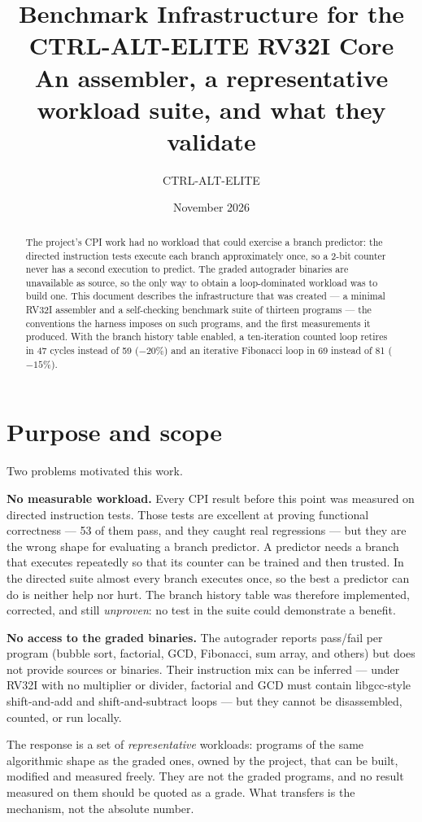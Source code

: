 \documentclass[11pt]{article}
\title{Benchmark Infrastructure for the CTRL-ALT-ELITE RV32I Core\\
\large An assembler, a representative workload suite, and what they validate}
\author{CTRL-ALT-ELITE}
\date{November 2026}
\begin{document}
\maketitle

\begin{abstract}
The project's CPI work had no workload that could exercise a branch predictor: the
directed instruction tests execute each branch approximately once, so a 2-bit counter
never has a second execution to predict. The graded autograder binaries are unavailable
as source, so the only way to obtain a loop-dominated workload was to build one.
This document describes the infrastructure that was created --- a minimal RV32I
assembler and a self-checking benchmark suite of thirteen programs --- the conventions the
harness imposes on such programs, and the first measurements it produced. With the
branch history table enabled, a ten-iteration counted loop retires in 47 cycles instead
of 59 ($-20\%$) and an iterative Fibonacci loop in 69 instead of 81 ($-15\%$).
\end{abstract}

\section{Purpose and scope}

Two problems motivated this work.

\textbf{No measurable workload.} Every CPI result before this point was measured on
directed instruction tests. Those tests are excellent at proving functional correctness
--- 53 of them pass, and they caught real regressions --- but they are the wrong shape
for evaluating a branch predictor. A predictor needs a branch that executes repeatedly
so that its counter can be trained and then trusted. In the directed suite almost every
branch executes once, so the best a predictor can do is neither help nor hurt. The
branch history table was therefore implemented, corrected, and still \emph{unproven}:
no test in the suite could demonstrate a benefit.

\textbf{No access to the graded binaries.} The autograder reports pass/fail per program
(bubble sort, factorial, GCD, Fibonacci, sum array, and others) but does not provide
sources or binaries. Their instruction mix can be inferred --- under RV32I with no
multiplier or divider, factorial and GCD must contain libgcc-style shift-and-add and
shift-and-subtract loops --- but they cannot be disassembled, counted, or run locally.

The response is a set of \emph{representative} workloads: programs of the same
algorithmic shape as the graded ones, owned by the project, that can be built, modified
and measured freely. They are not the graded programs, and no result measured on them
should be quoted as a grade. What transfers is the mechanism, not the absolute number.
\end{document}
